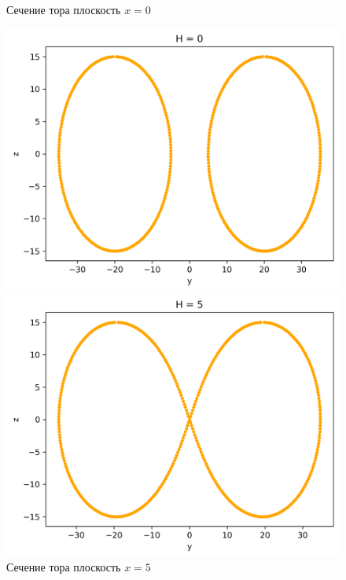 \documentclass[a4]{article}
\begin{document}
\begin{figure}[H]
\begin{center}
\caption{Сечение тора плоскость $x=0$ }
\includegraphics[scale=0.72]{TS0.png} 

\caption{Сечение тора плоскость $x=5$ }
\includegraphics[scale=0.72]{TS5.png} 
\end{center}
\end{figure}
\end{document}
